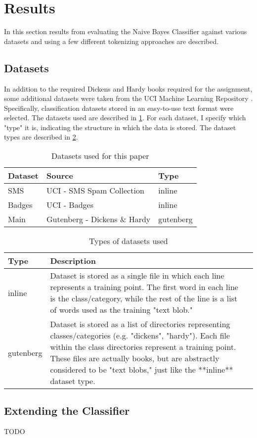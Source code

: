 \section{Results}
\label{section:results}
In this section results from evaluating the Naive Bayes Classifier against various datasets and using a few different
tokenizing approaches are described.

\subsection{Datasets}
\label{subsection:datasets}
In addition to the required Dickens and Hardy books required for the assignment, some additional datasets
were taken from the UCI Machine Learning Repository \cite{uci}. Specifically, classification datasets stored in an
easy-to-use text format were selected. The datasets used are described in \ref{table:datasets}. For each dataset, I
specify which "type" it is, indicating the structure in which the data is stored. The dataset types are described in
\ref{table:datasetTypes}.


\begin{table}
    \begin{tabular}{lll}
        \hline
        \textbf{Dataset} & \textbf{Source} & \textbf{Type} \\ [0.5ex]
        \hline\hline
        SMS & UCI - SMS Spam Collection & inline \\
        Badges & UCI - Badges & inline \\
        Main & Gutenberg - Dickens \& Hardy & gutenberg \\
        \hline
    \end{tabular}
    \caption{Datasets used for this paper}
    \label{table:datasets}
\end{table}

\begin{table}
    \begin{tabular}{lll}
        \hline
        \textbf{Type} & \textbf{Description} \\ [0.5ex]
        \hline\hline
        inline & Dataset is stored as a single file in which each line represents a training point. The first word in each line is the class/category, while the rest of the line is a list of words used as the training "text blob." \\
        gutenberg & Dataset is stored as a list of directories representing classes/categories (e.g. "dickens", "hardy"). Each file within the class directories represent a training point. These files are actually books, but are abstractly considered to be "text blobs," just like the **inline** dataset type. \\
        \hline
    \end{tabular}
    \caption{Types of datasets used}
    \label{table:datasetTypes}
\end{table}



\subsection{Extending the Classifier}
\label{subsection:advancedResults}
TODO


